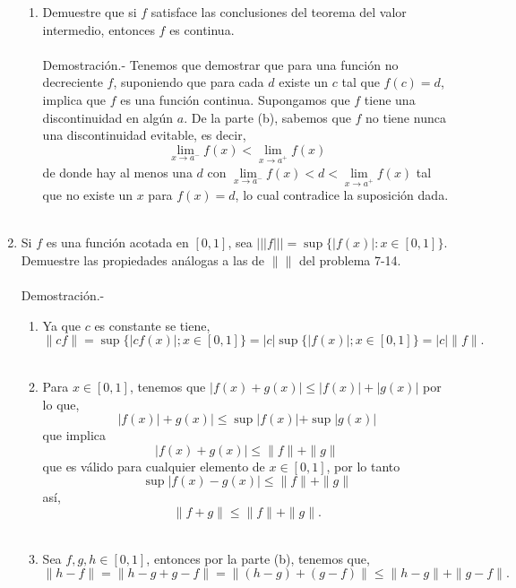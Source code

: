 \begin{enumerate}[\bfseries 1.]
\begin{enumerate}[\bfseries (a)]
	    \item Demuestre que si $f$ satisface las conclusiones del teorema del valor intermedio, entonces $f$ es continua.\\\\
		Demostración.-\; Tenemos que demostrar que para una función no decreciente $f$, suponiendo que para cada $d$ existe un $c$ tal que $f(c)=d$, implica que $f$ es una función continua. Supongamos que $f$ tiene una discontinuidad en algún $a$. De la parte (b), sabemos que $f$ no tiene nunca una discontinuidad evitable, es decir,
		$$\lim_{x\to a^-} f(x) <\lim_{x\to a^+} f(x)$$
		de donde hay al menos una $d$ con $\lim\limits_{x\to a^-}f(x)<d<\lim\limits_{x\to a^+} f(x)$ tal que no existe un $x$ para $f(x)=d$, lo cual contradice la suposición dada.\\\\

	\end{enumerate}

    \item Si $f$ es una función acotada en $[0,1]$, sea $|||f|||=\sup \lbrace |f(x)|:x \in [0,1]\rbrace$. Demuestre las propiedades análogas a las de $\|\|$ del problema 7-14.\\\\
	Demostración.-\; 

	\begin{enumerate}[\bfseries (a)]

	    \item Ya que $c$ es constante se tiene,
		$$\|cf\| = \sup \lbrace |cf(x)| ; x \in [0,1]\rbrace = |c|\sup \lbrace |f(x)| ; x \in [0,1]\rbrace = |c|\|f\|.$$\\

	    \item Para $x\in [0,1]$, tenemos que $|f(x)+g(x)|\leq |f(x)|+|g(x)|$ por lo que,
		$$|f(x)|+g(x)|\leq \sup |f(x)|+\sup |g(x)|$$
		que implica
		$$|f(x)+g(x)|\leq \|f\|+\|g\|$$
		que es válido para cualquier elemento de $x\in[0,1]$, por lo tanto 
		$$\sup|f(x)-g(x)|\leq \|f\|+\|g\|$$
		así,
		$$\|f+g\|\leq \|f\|+\|g\|.$$\\

	    \item Sea $f,g,h\in [0,1]$, entonces por la parte (b), tenemos que,
		$$\|h-f\|=\|h-g+g-f\|=\|(h-g)+(g-f)\|\leq \|h-g\|+\|g-f\|.$$\\\\


\end{enumerate}
\end{enumerate}

